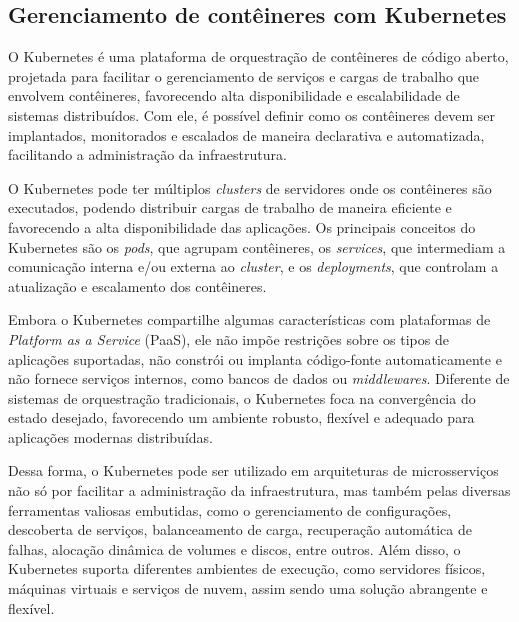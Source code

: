 

\subsection{Gerenciamento de contêineres com Kubernetes}
O Kubernetes é uma plataforma de orquestração de contêineres de código aberto, projetada para facilitar o gerenciamento de serviços e cargas de trabalho que envolvem contêineres, favorecendo alta disponibilidade e escalabilidade de sistemas distribuídos. Com ele, é possível definir como os contêineres devem ser implantados, monitorados e escalados de maneira declarativa e automatizada, facilitando a administração da infraestrutura. \cite{kubernetes}

O Kubernetes pode ter múltiplos \emph{clusters} de servidores onde os contêineres são executados, podendo distribuir cargas de trabalho de maneira eficiente e favorecendo a alta disponibilidade das aplicações. Os principais conceitos do Kubernetes são os \emph{pods}, que agrupam contêineres, os \emph{services}, que intermediam a comunicação interna e/ou externa ao \emph{cluster}, e os \emph{deployments}, que controlam a atualização e escalamento dos contêineres. \cite{kubernetes}

Embora o Kubernetes compartilhe algumas características com plataformas de \emph{Platform as a Service} (PaaS), ele não impõe restrições sobre os tipos de aplicações suportadas, não constrói ou implanta código-fonte automaticamente e não fornece serviços internos, como bancos de dados ou \emph{middlewares}. Diferente de sistemas de orquestração tradicionais, o Kubernetes foca na convergência do estado desejado, favorecendo um ambiente robusto, flexível e adequado para aplicações modernas distribuídas.  \cite{kubernetes}

Dessa forma, o Kubernetes pode ser utilizado em arquiteturas de microsserviços não só por facilitar a administração da infraestrutura, mas também pelas diversas ferramentas valiosas embutidas, como o gerenciamento de configurações, descoberta de serviços, balanceamento de carga, recuperação automática de falhas, alocação dinâmica de volumes e discos, entre outros. Além disso, o Kubernetes suporta diferentes ambientes de execução, como servidores físicos, máquinas virtuais e serviços de nuvem, assim sendo uma solução abrangente e flexível.

